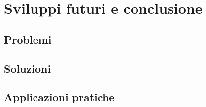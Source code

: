 \section{Sviluppi futuri e conclusione}
\subsection{Problemi}
\subsection{Soluzioni}
\subsection{Applicazioni pratiche}
